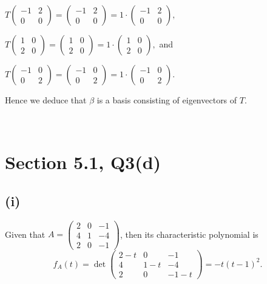 \documentclass[12pt]{article}%
\begin{document}
$T\begin{pmatrix}-1&2\\0&0\end{pmatrix}=\begin{pmatrix}-1&2\\0&0\end{pmatrix}=1\cdot \begin{pmatrix}-1&2\\0&0\end{pmatrix},$ 

$T\begin{pmatrix}1&0\\2&0\end{pmatrix}=\begin{pmatrix}1&0\\2&0\end{pmatrix}=1\cdot \begin{pmatrix}1&0\\2&0\end{pmatrix},$ and 

$T\begin{pmatrix}-1&0\\0&2\end{pmatrix}=\begin{pmatrix}-1&0\\0&2\end{pmatrix}=1\cdot \begin{pmatrix}-1&0\\0&2\end{pmatrix}.$

Hence we deduce that $\beta$ is a basis consisting of eigenvectors of $T$.

~\ 

\section{Section 5.1, Q3(d)}
\subsection{(i)}
Given that $A = \begin{pmatrix}2&0&-1\\4&1&-4\\2&0&-1\end{pmatrix}$, then its characteristic polynomial is $$f_{A}(t)=\det{\begin{pmatrix}2-t&0&-1\\4&1-t&-4\\2&0&-1-t\end{pmatrix}}=-t(t-1)^2.$$
\end{document}
